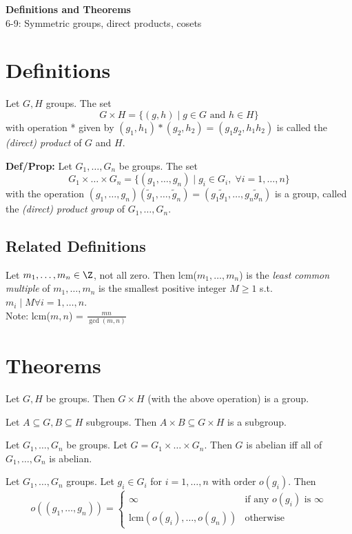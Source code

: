 \noindent
\textbf{\LARGE Definitions and Theorems} \\
\large 6-9: Symmetric groups, direct products, cosets 

\normalsize 

\section*{Definitions}
 Let $G, H$ groups. The set 
\[G \times H = \{(g, h) \mid g \in G \text{ and } h \in H\}\] 
with operation * given by $(g_1, h_1) \ast (g_2, h_2) = (g_1g_2, h_1h_2)$
is called the \textit{(direct) product} of $G$ and $H$.

\bigskip
\noindent
\textbf{Def/Prop:} Let $G_1, \ldots, G_n$ be groups. The set 
\[G_1 \times \ldots \times G_n = \{(g_1, \ldots, g_n) \mid g_i \in G_i, \; \forall i = 1, \ldots, n\}\]
with the operation $(g_1, \ldots, g_n)(\tilde{g}_1, \ldots, \tilde{g}_n) = (g_1\tilde{g}_1, \ldots, g_n\tilde{g}_n)$
is a group, called the \textit{(direct) product group} of $G_1, \ldots, G_n$.

\subsection*{Related Definitions}
 Let $m_1, \ldots, m_n \in \Z$, not all zero. Then lcm($m_1, \ldots, m_n$) is the \textit{least common multiple} of $m_1, \ldots, m_n$ is the smallest positive integer $M \ge 1$ s.t. $m_i \mid M \forall i = 1, \ldots, n$.\\
Note: lcm($m,n$) = $\frac{mn}{\gcd(m,n)}$


\section*{Theorems}
\prop Let $G, H$ be groups. Then $G \times H$ (with the above operation) is a group.

\thm Let $A \subseteq G, B \subseteq H$ subgroups. Then $A \times B \subseteq G \times H$ is a subgroup.

\prop Let $G_1, \ldots, G_n$ be groups. Let $G = G_1 \times \ldots \times G_n$. Then $G$ is abelian iff all of $G_1, \ldots, G_n$ is abelian.

\thm Let $G_1, \ldots, G_n$ groups. Let $g_i \in G_i$ for $i = 1, \ldots, n$ with order $o(g_i)$. Then 
$$o((g_1, \ldots, g_n)) = 
\begin{cases}
    \infty & \text{if any } o(g_i) \text{ is } \infty \\
    \text{lcm}(o(g_i), \ldots, o(g_n)) & \text{otherwise}
\end{cases}$$